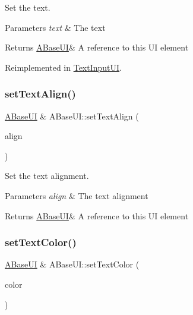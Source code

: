 Set the text. 


\begin{DoxyParams}{Parameters}
{\em text} & The text \\
\hline
\end{DoxyParams}
\begin{DoxyReturn}{Returns}
\hyperlink{class_a_base_u_i}{A\+Base\+UI}\& A reference to this UI element 
\end{DoxyReturn}


Reimplemented in \hyperlink{class_text_input_u_i_a2897827565bcb1d849cd36d3c9baf7a9}{Text\+Input\+UI}.

\mbox{\label{class_a_base_u_i_a4a88d65cb4a5767c280e0849e56a519b}} 
\subsubsection{\texorpdfstring{set\+Text\+Align()}{setTextAlign()}}
{\footnotesize\ttfamily \hyperlink{class_a_base_u_i}{A\+Base\+UI} \& A\+Base\+U\+I\+::set\+Text\+Align (\begin{DoxyParamCaption}\item[{Text\+Align\+::\+Enum}]{align }\end{DoxyParamCaption})\hspace{0.3cm}{\ttfamily [virtual]}}



Set the text alignment. 


\begin{DoxyParams}{Parameters}
{\em align} & The text alignment \\
\hline
\end{DoxyParams}
\begin{DoxyReturn}{Returns}
\hyperlink{class_a_base_u_i}{A\+Base\+UI}\& A reference to this UI element 
\end{DoxyReturn}
\mbox{\label{class_a_base_u_i_a5d22d531f4fd1d59b9cfff0f2f3e4b8d}} 
\subsubsection{\texorpdfstring{set\+Text\+Color()}{setTextColor()}}
{\footnotesize\ttfamily \hyperlink{class_a_base_u_i}{A\+Base\+UI} \& A\+Base\+U\+I\+::set\+Text\+Color (\begin{DoxyParamCaption}\item[{glm\+::vec4}]{color }\end{DoxyParamCaption})\hspace{0.3cm}{\ttfamily [virtual]}}



